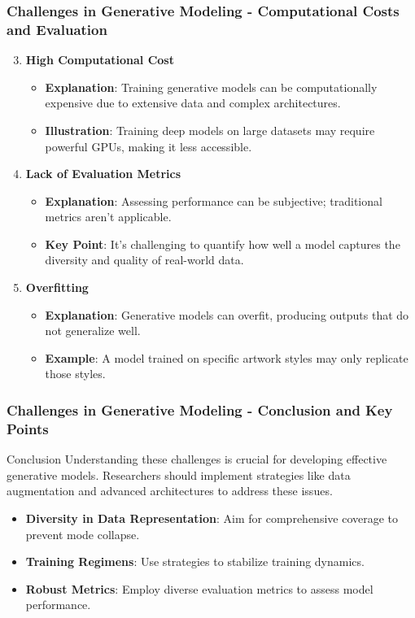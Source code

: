 \documentclass[aspectratio=169]{beamer}
\begin{document}
\begin{frame}[fragile]
    \frametitle{Challenges in Generative Modeling - Computational Costs and Evaluation}
    \begin{enumerate}
        \setcounter{enumi}{2}
        \item \textbf{High Computational Cost}
        \begin{itemize}
            \item \textbf{Explanation}: Training generative models can be computationally expensive due to extensive data and complex architectures.
            \item \textbf{Illustration}: Training deep models on large datasets may require powerful GPUs, making it less accessible.
        \end{itemize}

        \item \textbf{Lack of Evaluation Metrics}
        \begin{itemize}
            \item \textbf{Explanation}: Assessing performance can be subjective; traditional metrics aren't applicable.
            \item \textbf{Key Point}: It's challenging to quantify how well a model captures the diversity and quality of real-world data.
        \end{itemize}

        \item \textbf{Overfitting}
        \begin{itemize}
            \item \textbf{Explanation}: Generative models can overfit, producing outputs that do not generalize well.
            \item \textbf{Example}: A model trained on specific artwork styles may only replicate those styles.
        \end{itemize}
    \end{enumerate}
\end{frame}

\begin{frame}[fragile]
    \frametitle{Challenges in Generative Modeling - Conclusion and Key Points}
    \begin{block}{Conclusion}
        Understanding these challenges is crucial for developing effective generative models. Researchers should implement strategies like data augmentation and advanced architectures to address these issues.
    \end{block}

    \begin{itemize}
        \item \textbf{Diversity in Data Representation}: Aim for comprehensive coverage to prevent mode collapse.
        \item \textbf{Training Regimens}: Use strategies to stabilize training dynamics.
        \item \textbf{Robust Metrics}: Employ diverse evaluation metrics to assess model performance.
    \end{itemize}
\end{frame}
\end{document}
